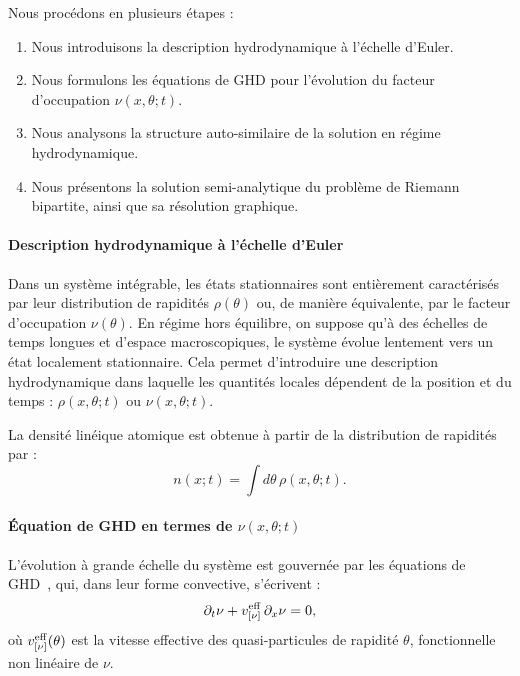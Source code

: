 Nous procédons en plusieurs étapes : 
\begin{enumerate}
  \item Nous introduisons la description hydrodynamique à l’échelle d’Euler.
  \item Nous formulons les équations de GHD pour l’évolution du facteur d’occupation $\nu(x,\theta;t)$.
  \item Nous analysons la structure auto-similaire de la solution en régime hydrodynamique.
  \item Nous présentons la solution semi-analytique du problème de Riemann bipartite, ainsi que sa résolution graphique.
\end{enumerate}

\paragraph{Description hydrodynamique à l’échelle d’Euler}

Dans un système intégrable, les états stationnaires sont entièrement caractérisés par leur distribution de rapidités $\rho(\theta)$ ou, de manière équivalente, par le facteur d’occupation $\nu(\theta)$. En régime hors équilibre, on suppose qu’à des échelles de temps longues et d’espace macroscopiques, le système évolue lentement vers un état localement stationnaire. Cela permet d’introduire une description hydrodynamique dans laquelle les quantités locales dépendent de la position et du temps : $\rho(x,\theta;t)$ ou $\nu(x,\theta;t)$.

La densité linéique atomique est obtenue à partir de la distribution de rapidités par :
\begin{equation}
    n(x;t) = \int d\theta \, \rho(x,\theta ; t).
    \label{eq:lineardensity}
\end{equation}

\paragraph{Équation de GHD en termes de $\nu(x,\theta;t)$}

L’évolution à grande échelle du système est gouvernée par les équations de GHD~\cite{bertini_transport_2016, castro-alvaredo_emergent_2016}, qui, dans leur forme convective, s’écrivent :
\begin{equation}
    \label{eq:nu.cont}
    \partial_t \nu + v^{\rm eff}_{[\nu]} \, \partial_x \nu = 0,
\end{equation}
où $v^{\rm eff}_{[\nu]}(\theta)$ est la vitesse effective des quasi-particules de rapidité $\theta$, fonctionnelle non linéaire de $\nu$.

